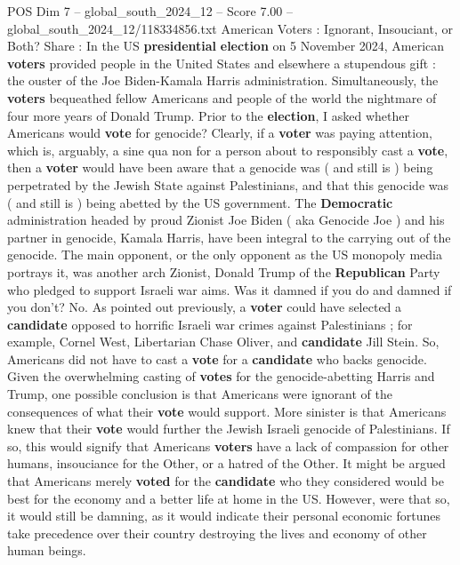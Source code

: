 \begin{textsample}{POS Dim 7 – global\_south\_2024\_12 – Score 7.00 – global\_south\_2024\_12/118334856.txt}  \label{ex:f7_pos_351}
American Voters : Ignorant, Insouciant, or Both?
Share : In the US \textbf{presidential} \textbf{election} on 5 November 2024, American \textbf{voters} provided people in the United States and elsewhere a stupendous gift : the ouster of the Joe Biden-Kamala Harris administration.
Simultaneously, the \textbf{voters} bequeathed fellow Americans and people of the world the nightmare of four more years of Donald Trump.
Prior to the \textbf{election}, I asked whether Americans would \textbf{vote} for genocide?
Clearly, if a \textbf{voter} was paying attention, which is, arguably, a sine qua non for a person about to responsibly cast a \textbf{vote}, then a \textbf{voter} would have been aware that a genocide was ( and still is ) being perpetrated by the Jewish State against Palestinians, and that this genocide was ( and still is ) being abetted by the US government.
The \textbf{Democratic} administration headed by proud Zionist Joe Biden ( aka Genocide Joe ) and his partner in genocide, Kamala Harris, have been integral to the carrying out of the genocide.
The main opponent, or the only opponent as the US monopoly media portrays it, was another arch Zionist, Donald Trump of the \textbf{Republican} Party who pledged to support Israeli war aims.
Was it damned if you do and damned if you don't?
No.
As pointed out previously, a \textbf{voter} could have selected a \textbf{candidate} opposed to horrific Israeli war crimes against Palestinians ; for example, Cornel West, Libertarian Chase Oliver, and \textbf{candidate} Jill Stein.
So, Americans did not have to cast a \textbf{vote} for a \textbf{candidate} who backs genocide.
Given the overwhelming casting of \textbf{votes} for the genocide-abetting Harris and Trump, one possible conclusion is that Americans were ignorant of the consequences of what their \textbf{vote} would support.
More sinister is that Americans knew that their \textbf{vote} would further the Jewish Israeli genocide of Palestinians.
If so, this would signify that Americans \textbf{voters} have a lack of compassion for other humans, insouciance for the Other, or a hatred of the Other.
It might be argued that Americans merely \textbf{voted} for the \textbf{candidate} who they considered would be best for the economy and a better life at home in the US.
However, were that so, it would still be damning, as it would indicate their personal economic fortunes take precedence over their country destroying the lives and economy of other human beings.

\end{textsample}
